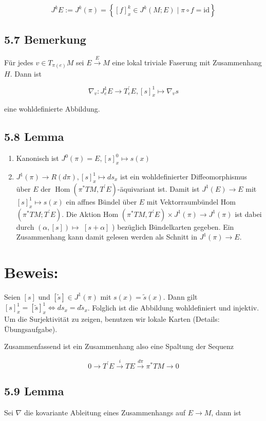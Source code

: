 \documentclass[10pt, letterpaper]{article}
\begin{document}
$$
J^{k} E:=J^{k}(\pi)=\left\{[f]_{x}^{k} \in J^{k}(M ; E) \mid \pi \circ f=\mathrm{id}\right\}
$$

\subsection*{5.7 Bemerkung}
Für jedes $v \in T_{\pi(e)} M$ sei $E \xrightarrow{E} M$ eine lokal triviale Faserung mit Zusammenhang $H$. Dann ist

$$
\nabla_{v}: J_{e}^{1} E \rightarrow T_{e}^{\prime} E,[s]_{x}^{1} \mapsto \nabla_{v} s
$$

eine wohldefinierte Abbildung.

\subsection*{5.8 Lemma}
\begin{enumerate}
  \item Kanonisch ist $J^{0}(\pi)=E,[s]_{x}^{0} \mapsto s(x)$
  \item $J^{1}(\pi) \rightarrow R(d \pi),[s]_{x}^{1} \mapsto d s_{x}$ ist ein wohldefinierter Diffeomorphismus über $E$ der $\operatorname{Hom}\left(\pi^{*} T M, T^{\prime} E\right)$-äquivariant ist. Damit ist $J^{1}(E) \rightarrow E$ mit $[s]_{x}^{1} \mapsto s(x)$ ein affnes Bündel über $E$ mit Vektorraumbündel Hom $\left(\pi^{*} T M ; T^{\prime} E\right)$. Die Aktion Hom $\left(\pi^{*} T M, T^{\prime} E\right) \times J^{1}(\pi) \rightarrow J^{1}(\pi)$ ist dabei durch $(\alpha,[s]) \mapsto$ $[s+\alpha]$ ) bezüglich Bündelkarten gegeben. Ein Zusammenhang kann damit gelesen werden als Schnitt in $J^{1}(\pi) \rightarrow E$.
\end{enumerate}

\section*{Beweis:}
Seien $[s]$ und $[\tilde{s}] \in J^{1}(\pi)$ mit $s(x)=\tilde{s}(x)$. Dann gilt $[s]_{x}^{1}=[\tilde{s}]_{x}^{1} \Leftrightarrow d s_{x}=d \tilde{s}_{x}$. Folglich ist die Abbildung wohldefiniert und injektiv. Um die Surjektivität zu zeigen, benutzen wir lokale Karten (Details: Übungsaufgabe).

Zusammenfassend ist ein Zusammenhang also eine Spaltung der Sequenz

$$
0 \rightarrow T^{\prime} E \xrightarrow{i} T E \xrightarrow{d \pi} \pi^{*} T M \rightarrow 0
$$

\subsection*{5.9 Lemma}
Sei $\nabla$ die kovariante Ableitung eines Zusammenhangs auf $E \rightarrow M$, dann ist
\end{document}
